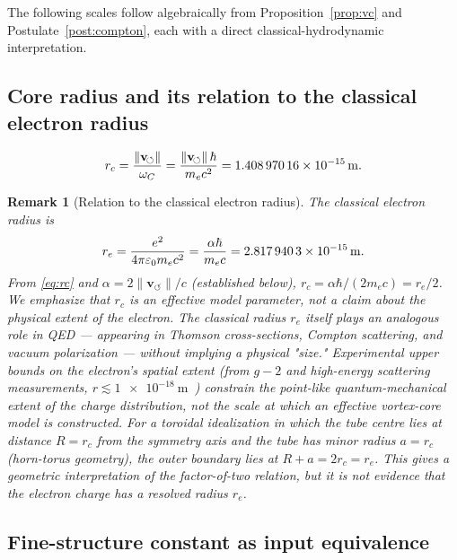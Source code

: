 \documentclass[aps,pra,preprint,longbibliography,nofootinbib]{revtex4-2}
\newtheorem{remark}{Remark}
\newcommand{\vnorm}{\lVert\mathbf{v}_{\!\boldsymbol{\circlearrowleft}}\rVert} %
\newcommand{\rc}{r_c}                            %
\newcommand{\omC}{\omega_C}                      %
\begin{document}
The following scales follow algebraically from
Proposition~\ref{prop:vc} and Postulate~\ref{post:compton},
each with a direct classical-hydrodynamic interpretation.

\subsection{Core radius and its relation to the classical electron radius}
\label{sec:rc}

\begin{equation}
  \rc = \frac{\vnorm}{\omC} = \frac{\vnorm\,\hbar}{m_e c^2}
      = \SI{1.408\,970\,16e-15}{\meter}.
  \label{eq:rc}
\end{equation}

\begin{remark}[Relation to the classical electron radius]
\label{rem:re}
The classical electron radius is
\begin{equation}
  r_e = \frac{e^2}{4\pi\varepsilon_0 m_e c^2}
      = \frac{\alpha\hbar}{m_e c}
      = \SI{2.817\,940\,3e-15}{\meter}.
  \label{eq:re}
\end{equation}
From \eqref{eq:rc} and $\alpha = 2\vnorm/c$ (established below),
$\rc = \alpha\hbar/(2m_e c) = r_e/2$.
We emphasize that $\rc$ is an \emph{effective model parameter},
not a claim about the physical extent of the electron.
The classical radius $r_e$ itself plays an analogous role in QED
— appearing in Thomson cross-sections, Compton scattering, and
vacuum polarization — without implying a physical "size."
Experimental upper bounds on the electron's spatial extent
(from $g{-}2$ and high-energy scattering measurements,
$r \lesssim \SI{1e-18}{\meter}$~\cite{PDG2022}) constrain the
\emph{point-like} quantum-mechanical extent of the charge
distribution, not the scale at which an effective vortex-core
model is constructed.
For a toroidal idealization in which the tube centre lies at distance
$R = \rc$ from the symmetry axis and the tube has minor radius
$a = \rc$ (horn-torus geometry), the outer boundary lies at
$R+a=2\rc=r_e$.  This gives a geometric interpretation of the
factor-of-two relation, but it is not evidence that the electron charge
has a resolved radius $r_e$.
\end{remark}

\subsection{Fine-structure constant as input equivalence}
\label{sec:alpha}
\end{document}
